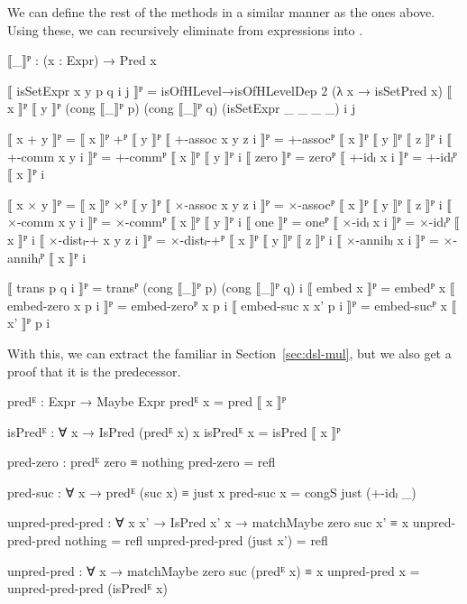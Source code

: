 We can define the rest of the methods in a similar manner as the ones above.
Using these, we can recursively eliminate from expressions into
.
\begin{code}
  ⟦_⟧ᴾ : (x : Expr) → Pred x
\end{code}
\begin{code}[hide]
  ⟦ isSetExpr x y p q i j ⟧ᴾ =
    isOfHLevel→isOfHLevelDep 2 (λ x → isSetPred x)
      ⟦ x ⟧ᴾ ⟦ y ⟧ᴾ (cong ⟦_⟧ᴾ p) (cong ⟦_⟧ᴾ q) (isSetExpr _ _ _ _) i j

  ⟦ x + y ⟧ᴾ = ⟦ x ⟧ᴾ +ᴾ ⟦ y ⟧ᴾ
  ⟦ +-assoc x y z i ⟧ᴾ = +-assocᴾ ⟦ x ⟧ᴾ ⟦ y ⟧ᴾ ⟦ z ⟧ᴾ i
  ⟦ +-comm x y i ⟧ᴾ = +-commᴾ ⟦ x ⟧ᴾ ⟦ y ⟧ᴾ i
  ⟦ zero ⟧ᴾ = zeroᴾ
  ⟦ +-idₗ x i ⟧ᴾ = +-idₗᴾ ⟦ x ⟧ᴾ i

  ⟦ x × y ⟧ᴾ = ⟦ x ⟧ᴾ ×ᴾ ⟦ y ⟧ᴾ
  ⟦ ×-assoc x y z i ⟧ᴾ = ×-assocᴾ ⟦ x ⟧ᴾ ⟦ y ⟧ᴾ ⟦ z ⟧ᴾ i
  ⟦ ×-comm x y i ⟧ᴾ = ×-commᴾ ⟦ x ⟧ᴾ ⟦ y ⟧ᴾ i
  ⟦ one ⟧ᴾ = oneᴾ
  ⟦ ×-idₗ x i ⟧ᴾ = ×-idₗᴾ ⟦ x ⟧ᴾ i
  ⟦ ×-distₗ-+ x y z i ⟧ᴾ = ×-distₗ-+ᴾ ⟦ x ⟧ᴾ ⟦ y ⟧ᴾ ⟦ z ⟧ᴾ i
  ⟦ ×-annihₗ x i ⟧ᴾ = ×-annihₗᴾ ⟦ x ⟧ᴾ i

  ⟦ trans p q i ⟧ᴾ = transᴾ (cong ⟦_⟧ᴾ p) (cong ⟦_⟧ᴾ q) i
  ⟦ embed x ⟧ᴾ = embedᴾ x
  ⟦ embed-zero x p i ⟧ᴾ = embed-zeroᴾ x p i
  ⟦ embed-suc x x' p i ⟧ᴾ = embed-sucᴾ x ⟦ x' ⟧ᴾ p i
\end{code}

With this, we can extract the familiar  in
Section~\ref{sec:dsl-mul}, but we also get a proof that it is the predecessor.
\begin{code}
  predᴱ : Expr → Maybe Expr
  predᴱ x = pred ⟦ x ⟧ᴾ

  isPredᴱ : ∀ x → IsPred (predᴱ x) x
  isPredᴱ x = isPred ⟦ x ⟧ᴾ
\end{code}
\begin{code}[hide]
  pred-zero : predᴱ zero ≡ nothing
  pred-zero = refl

  pred-suc : ∀ x → predᴱ (suc x) ≡ just x
  pred-suc x = congS just (+-idₗ _)

  unpred-pred-pred : ∀ {x x'} → IsPred x' x → matchMaybe zero suc x' ≡ x
  unpred-pred-pred nothing = refl
  unpred-pred-pred (just x') = refl

  unpred-pred : ∀ x → matchMaybe zero suc (predᴱ x) ≡ x
  unpred-pred x = unpred-pred-pred (isPredᴱ x)
\end{code}

